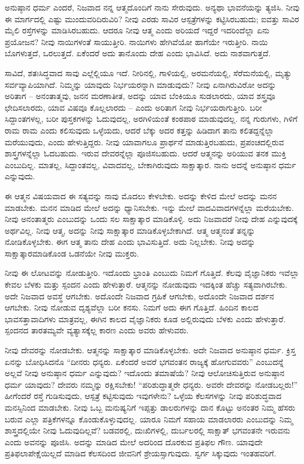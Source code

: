ಅನುಷ್ಠಾನ ಧರ್ಮ ಎಂದರೆ, ನಿಜವಾದ ನನ್ನ ಆತ್ಮದೊಂದಿಗೆ ನಾನು ಸೇರುವುದು. ಅನ್ಯಥಾ ಭಾವನೆಯನ್ನು ತ್ಯಜಿಸಿ. ನೀವು ಈ ಮಾರ್ಗದಲ್ಲಿ ಎಷ್ಟು ಮುಂದುವರಿದಿರುವಿರಿ? ನೀವು ಎರಡು ಸಾವಿರ ಆಸ್ಪತ್ರೆಗಳನ್ನು ಕಟ್ಟಿಸಿರಬಹುದು; ಐವತ್ತು ಸಾವಿರ ಮೈಲಿ ರಸ್ತೆಗಳನ್ನು ಮಾಡಿಸಿರಬಹುದು. ಆದರೂ ನೀವು ಆತ್ಮ ಎಂದು ಅರಿಯದೆ ಇದ್ದರೆ ಇದರಿಂದೆಲ್ಲಾ ಏನು ಪ್ರಯೋಜನ? ನೀವು ನಾಯಿಗಳಂತೆ ಸಾಯುತ್ತೀರಿ. ನಾಯಿಗಳು ಹೇಗಿವೆಯೋ ಹಾಗೆಯೇ ಇರುತ್ತೀರಿ. ನಾಯಿ ಬೊಗಳುತ್ತದೆ, ಒರಲುತ್ತದೆ. ಏಕೆಂದರೆ ಅದು ತಾನೊಂದು ದೇಹ ಎಂದು ಭಾವಿಸಿದೆ. ಅದು ನಾಶವಾಗುತ್ತದೆ.

ಸಾವಿದೆ, ಶತಃಸಿದ್ಧವಾದ ಸಾವು ಎಲ್ಲೆಲ್ಲಿಯೂ ಇದೆ. ನೀರಿನಲ್ಲಿ, ಗಾಳಿಯಲ್ಲಿ, ಅರಮನೆಯಲ್ಲಿ, ಸೆರೆಮನೆಯಲ್ಲಿ, ಮೃತ್ಯು ಸರ್ವವ್ಯಾಪಿಯಾಗಿದೆ. ನಿಮ್ಮನ್ನು ಯಾವುದು ನಿರ್ಭಯರನ್ನಾಗಿ ಮಾಡುವುದು? ನೀವು ಏನಾಗಿರುವಿರೋ ಅದನ್ನು ಅರಿತಾಗ – ಅನಂತಾತ್ಮವು, ಜನನ ಮರಣಾತೀತ, ಅದನ್ನು ಯಾವ ಬೆಂಕಿಯೂ ಸುಡಲಾರದು, ಯಾವ ಶಸ್ತ್ರವೂ ಛೇದಿಸಲಾರದು, ಯಾವ ವಿಷವೂ ಕೊಲ್ಲಲಾರದು – ಎಂದು ಅರಿತಾಗ ನೀವು ನಿರ್ಭಯರಾಗುತ್ತೀರಿ. ಬರೀ ಸಿದ್ದಾಂತಗಳಲ್ಲ, ಬರೀ ಪುಸ್ತಕಗಳನ್ನು ಓದುವುದಲ್ಲ, ಅರಗಿಳಿಯಂತೆ ಕಂಠಪಾಠ ಮಾಡುವುದಲ್ಲ. ನನ್ನ ಗುರುಗಳು, ಗಿಳಿಗೆ ರಾಮ ರಾಮ ಎಂದು ಕಲಿಸುವುದು ಒಳ್ಳೆಯದು, ಆದರೆ ಬೆಕ್ಕು ಅದರ ಕತ್ತನ್ನು ಹಿಡಿದಾಗ ತಾನು ಕಲಿತದ್ದನ್ನೆಲ್ಲಾ ಮರೆಯುವುದು, ಎಂದು ಹೇಳುತ್ತಿದ್ದರು. ನೀವು ಯಾವಾಗಲೂ ಪ್ರಾರ್ಥನೆ ಮಾಡುತ್ತಿರಬಹುದು, ಪ್ರಪಂಚದಲ್ಲಿರುವ ಶಾಸ್ತ್ರಗಳನ್ನೆಲ್ಲಾ ಓದಬಹುದು. ಇರುವ ದೇವರನ್ನೆಲ್ಲಾ ಪೂಜಿಸಬಹುದು. ಆದರೆ ಆತ್ಮನನ್ನು ಅರಿಯುವ ತನಕ ಮುಕ್ತಿ ಎಂಬುದಿಲ್ಲ. ಮಾತಲ್ಲ, ಸಿದ್ದಾಂತವಲ್ಲ, ವಿವಾದವಲ್ಲ, ಬೇಕಾಗಿರುವುದು ಸಾಕ್ಷಾತ್ಕಾರ. ನಾನು ಅದನ್ನೆ ಅನುಷ್ಠಾನ ಧರ್ಮ ಎನ್ನುವುದು.

\vskip 3pt

ಈ ಆತ್ಮನ ವಿಷಯವಾದ ಈ ಸತ್ಯವನ್ನು ನಾವು ಮೊದಲು ಕೇಳಬೇಕು. ಅದನ್ನು ಕೇಳಿದ ಮೇಲೆ ಅದನ್ನು ಮನನ ಮಾಡಬೇಕು. ಮನನ ಮಾಡಿದ ಮೇಲೆ ಅದನ್ನು ಧ್ಯಾನಿಸಬೇಕು. ಇನ್ನು ಮೇಲೆ ವಾದವಿವಾದಗಳನ್ನೆಲ್ಲಾ ಮರೆಯಬೇಕು. ನೀವು ಅನಂತಾತ್ಮರು ಎಂಬುದನ್ನು ಒಂದು ಸಲ ಸಾಕ್ಷಾತ್ಕಾರ ಮಾಡಿಕೊಳ್ಳಿ. ಅದು ನಿಜವಾದರೆ ನೀವು ದೇಹ ಎನ್ನುವುದಕ್ಕೆ ಅರ್ಥವಿಲ್ಲ. ನೀವು ಆತ್ಮ, ಅದನ್ನು ನೀವು ಸಾಕ್ಷಾತ್ಕಾರ ಮಾಡಿಕೊಳ್ಳಬೇಕಾಗಿದೆ. ಆತ್ಮ ಆತ್ಮನಂತೆ ತನ್ನನ್ನು ನೋಡಿಕೊಳ್ಳಬೇಕು. ಈಗ ಆತ್ಮ ತಾನು ದೇಹ ಎಂದು ಭಾವಿಸುತ್ತಿದೆ. ಅದು ನಿಲ್ಲಬೇಕು. ನೀವು ಅದನ್ನು ಸಾಕ್ಷಾತ್ಕಾರಮಾಡಿಕೊಂಡ ಒಡನೆಯೇ ನೀವು ಮುಕ್ತರು.

\vskip 3pt

ನೀವು ಈ ಲೋಟವನ್ನು ನೋಡುತ್ತೀರಿ. ಇದೊಂದು ಭ್ರಾಂತಿ ಎಂಬುದು ನಿಮಗೆ ಗೊತ್ತಿದೆ. ಕೆಲವು ವೈಜ್ಞಾನಿಕರು ಇವೆಲ್ಲಾ ಕೇವಲ ಬೆಳಕು ಮತ್ತು ಸ್ಪಂದನ ಎಂದು ಹೇಳುತ್ತಾರೆ. ಆತ್ಮನನ್ನು ನೋಡುವುದು ಇದಕ್ಕಿಂತ ಹೆಚ್ಚು ಸತ್ಯವಾಗಿರಬೇಕು. ಅದೇ ನಿಜವಾದ ಅವಸ್ಥೆ ಆಗಬೇಕು. ಅದೊಂದೇ ನಿಜವಾದ ಗ್ರಹಿಕೆ ಆಗಬೇಕು, ಅದೊಂದೇ ನಿಜವಾದ ದರ್ಶನ ಆಗಬೇಕು. ನೀವು ನೋಡುವ ದೃಶ್ಯವೆಲ್ಲಾ ಬರೀ ಕನಸು. ನಿಮಗೆ ಅದು ಈಗ ಗೊತ್ತಿದೆ. ಹಿಂದಿನ ಕಾಲದ ಭಾವಸತ್ತಾವಾದಿಗಳು ಮಾತ್ರವಲ್ಲ, ಈಗಿನ ಕಾಲದ ವೈಜ್ಞಾನಿಕರು ಕೂಡ ಅಲ್ಲಿರುವುದು ಬೆಳಕು ಎಂದು ಹೇಳುತ್ತಾರೆ. ಸ್ಪಂದನದ ತಾರತಮ್ಯವೇ ವ್ಯತ್ಯಾಸಕ್ಕೆಲ್ಲ ಕಾರಣ ಎಂದು ಅವರು ಹೇಳುವರು.

\vskip 3pt

ನೀವು ದೇವರನ್ನು ನೋಡಬೇಕು. ಆತ್ಮನನ್ನು ಸಾಕ್ಷಾತ್ಕಾರ ಮಾಡಿಕೊಳ್ಳಬೇಕು. ಅದೇ ನಿಜವಾದ ಅನುಷ್ಠಾನ ಧರ್ಮ. ಕ್ರಿಸ್ತ ಏನನ್ನು ಬೋಧಿಸಿದನೊ “ದೀನರು ಧನ್ಯರು. ಏಕೆಂದರೆ ಅವರೆ ಭಗವಂತನ ರಾಜ್ಯಕ್ಕೆ ಹೋಗುವವರು'' ಎಂಬುದನ್ನೆ ಅಲ್ಲವೆ ನೀವು ಅನುಷ್ಠಾನ ಧರ್ಮ ಎನ್ನುವುದು? ಇದೊಂದು ತಮಾಷೆಯೆ? ನೀವು ಆಲೋಚಿಸುತ್ತಿರುವ ಅನುಷ್ಠಾನ ಧರ್ಮ ಯಾವುದು? ದೇವರು ನಮ್ಮನ್ನು ರಕ್ಷಿಸಬೇಕು! “ಪರಿಶುದ್ಧಾತ್ಮರೇ ಧನ್ಯರು. ಅವರೇ ದೇವರನ್ನು ನೋಡಬಲ್ಲರು!” ಹೀಗೆಂದರೆ ರಸ್ತೆ ಗುಡಿಸುವುದು, ಆಸ್ಪತ್ರೆ ಕಟ್ಟಿಸುವುದು ಇವುಗಳೇನು? ಒಳ್ಳೆಯ ಕೆಲಸಗಳನ್ನು ನೀವು ಪರಿಶುದ್ಧವಾದ ಮನಸ್ಸಿನಿಂದ ಮಾಡಬೇಕು. ನೀವು ಒಬ್ಬ ಮನುಷ್ಯನಿಗೆ ಇಪ್ಪತ್ತು ಡಾಲರುಗಳನ್ನು ದಾನ ಕೊಟ್ಟು ಅನಂತರ ನಿಮ್ಮ ಹೆಸರು ಬರುವ ಎಲ್ಲಾ ಪತ್ರಿಕೆಗಳನ್ನೂ ಕೊಂಡುಕೊಳ್ಳುವುದಲ್ಲ. ಯಾರೂ ನಿಮಗೆ ಸಹಾಯ ಮಾಡಲಾರರು ಎಂಬುದನ್ನು ನಿಮ್ಮ ಶಾಸ್ತ್ರದಲ್ಲಿಯೇ ನೀವು ಓದುವುದಿಲ್ಲವೆ? ಬಡವರಲ್ಲಿ, ದುಃಖಿಗಳಲ್ಲಿ, ದುರ್ಬಲರಲ್ಲಿ ಸಾಕ್ಷಾತ್ ಭಗವಂತನೇ ಇರುವನು ಎಂದು ಅವನನ್ನು ಪೂಜಿಸಿ. ಅದನ್ನು ಮಾಡಿದ ಮೇಲೆ ಅದರಿಂದ ದೊರಕುವ ಪ್ರತಿಫಲ ಗೌಣ. ಯಾವುದೇ ಪ್ರತಿಫಲಾಪೇಕ್ಷೆಯಿಲ್ಲದೆ ಮಾಡಿದ ಕೆಲಸದಿಂದ ಜೀವನಿಗೆ ಶ್ರೇಯಸ್ಸಾಗುವುದು. ಸ್ವರ್ಗ ಸಿಕ್ಕುವುದು ಇಂತಹವರಿಗೆ.

